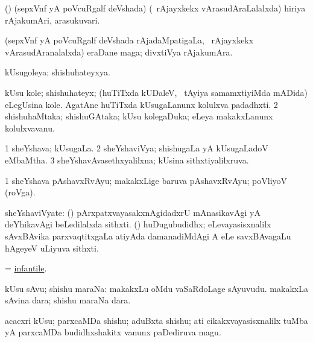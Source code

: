 \bentry
{}
\gl{\nA}
\bmng
(\ca) (sepxVnf yA poVcuRgalf deVshada) (\sA\ rAjayxkekx vArasudAraLalalxda) hiriya rAjakumAri, arasukuvari. 
\emng
\eentry

\bentry
{}
\gl{\nA}
\bmng
(sepxVnf yA poVcuRgalf deVshada rAjadaMpatigaLa, \sA\ rAjayxkekx vArasudAranalalxda) eraDane maga; divxtiVya rAjakumAra. 
\emng
\eentry

\bentry
{}
\gl{\gu}
\bmng
kUsugoleya; shishuhateyxya. 
\emng
\eentry

\bentry
{} 
\gl{\nA}
\bmng
\bnum
{} 
\banum
{} kUsu kole; shishuhateyx; (huTiTxda kUDaleV, \kanmu\ tAyiya samamxtiyiMda mADida) eLegUsina kole. 
 AgatAne huTiTxda kUsugaLanunx kolulxva padadhxti. 
\eanum
\numie
\num{2} shishuhaMtaka; shishuGAtaka; kUsu kolegaDuka; eLeya makakxLanunx kolulxvavanu. 
\enum
\emng
\eentry

\bentry
{}
\gl{\gu}
\bmng
\bnum
\num{1} sheYshava; kUsugaLa. 
\num{2} sheYshaviVya; shishugaLa yA kUsugaLadoV eMbaMtha. 
\num{3} sheYshavAvasethxyalilxna; kUsina sithxtiyalilxruva. 
\enum
\emng
\eentry

\bentry
{}
\gl{\gu}
\bmng
\bnum
\num{1} sheYshava pAshavxRvAyu; makakxLige baruva pAshavxRvAyu; poVliyoV (roVga). 
\enum
\emng
\eentry

\bentry
{}
\gl{\nA}
\bmng
sheYshaviVyate: 
\banum
{}  (\roVshA) pArxpatxvayasakxnAgidadxrU mAnasikavAgi yA deYhikavAgi beLedilalxda sithxti. 
 (\mashA) huDugubudidhx; eLevayasisxnalilx sAvxBAvika parxvaqtitxgaLa atiyAda damanadiMdAgi A eLe savxBAvagaLu hAgeyeV uLiyuva sithxti. 
\eanum
\emng
\eentry

\bentry
{}
\gl{\gu}
\bmng
 = \hyperlink{infantile}{infantile}. 
\emng
\eentry

\bentry
{}
\gl{\nA}
\bmng
kUsu sAvu; shishu maraNa: 
\banum
{} makakxLu oMdu vaSaRdoLage sAyuvudu. 
 makakxLa sAvina dara; shishu maraNa dara. 
\eanum
\emng
\eentry

\bentry
{}
\gl{\nA}
\bmng
acacxri kUsu; parxcaMDa shishu; aduBxta shishu; ati cikakxvayasisxnalilx tuMba yA parxcaMDa budidhxshakitx \mo vanunx paDediruva magu. 
\emng
\eentry

